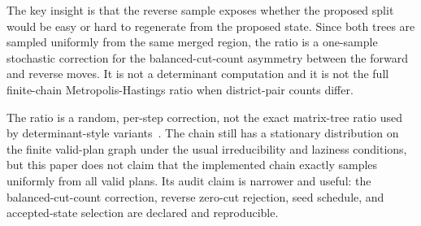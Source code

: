 The key insight is that the reverse sample exposes whether the proposed split
would be easy or hard to regenerate from the proposed state.
Since both trees are sampled uniformly from the same merged region, the ratio
is a one-sample stochastic correction for the balanced-cut-count asymmetry
between the forward and reverse moves.
It is not a determinant computation and it is not the full finite-chain
Metropolis-Hastings ratio when district-pair counts differ.

\begin{remark}
\label{rem:approx}
The \mergesplit{} ratio is a random, per-step correction, not the exact
matrix-tree ratio used by determinant-style \forestrecom{}
variants~\citep{mccartan2020,dellaLibera2026forestRecom}.
The chain still has a stationary distribution on the finite valid-plan graph
under the usual irreducibility and laziness conditions, but this paper does not
claim that the implemented chain exactly samples uniformly from all valid
plans.
Its audit claim is narrower and useful: the balanced-cut-count correction,
reverse zero-cut rejection, seed schedule, and accepted-state selection are
declared and reproducible.
\end{remark}
